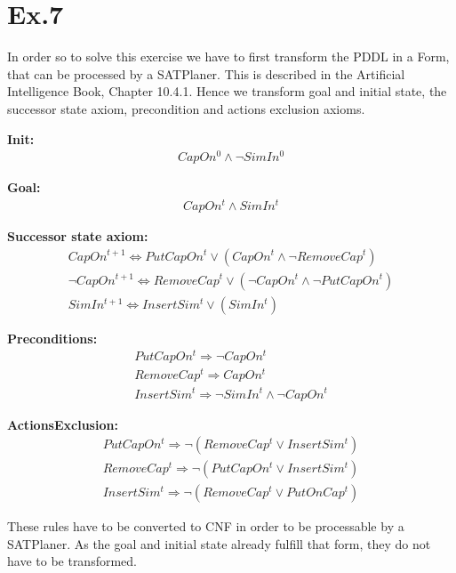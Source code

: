 \documentclass[11pt]{article}
\begin{document}
\section*{Ex.7}

In order so to solve this exercise we have to first transform the PDDL in a Form, that can be processed by a SATPlaner. This is described in the Artificial Intelligence Book, Chapter 10.4.1.
Hence we transform goal and initial state, the successor state axiom, precondition and actions exclusion axioms.
\newline

\textbf{Init:}
\begin{align}
CapOn^{0} \wedge \neg SimIn^{0}
\end{align}

\textbf{Goal:}
\begin{align}
CapOn^{t} \wedge SimIn^{t}
\end{align}

\textbf{Successor state axiom:}
\begin{align}
CapOn^{t+1} \Leftrightarrow PutCapOn^{t} \vee (CapOn^{t} \wedge \neg RemoveCap^{t})\\
\neg CapOn^{t+1} \Leftrightarrow RemoveCap^{t} \vee (\neg CapOn^{t} \wedge \neg PutCapOn^{t})\\
SimIn^{t+1} \Leftrightarrow InsertSim^{t} \vee (SimIn^{t})
\end{align}

\textbf{Preconditions:}
\begin{align}
PutCapOn^{t} \Rightarrow \neg CapOn^{t} \\
RemoveCap^{t} \Rightarrow CapOn^{t} \\
InsertSim^{t} \Rightarrow \neg SimIn^{t} \wedge \neg CapOn^{t}
\end{align}

\textbf{ActionsExclusion:}
\begin{align}
PutCapOn^{t} \Rightarrow \neg (RemoveCap^{t} \vee InsertSim^{t}) \\
RemoveCap^{t} \Rightarrow \neg (PutCapOn^{t} \vee InsertSim^{t}) \\
InsertSim^{t} \Rightarrow \neg (RemoveCap^{t} \vee PutOnCap^{t})
\end{align}
\newpage

\noindent
These rules have to be converted to CNF in order to be processable by a SATPlaner. As the goal and initial state already fulfill that form, they do not have to be transformed.\newline\newline
\end{document}
